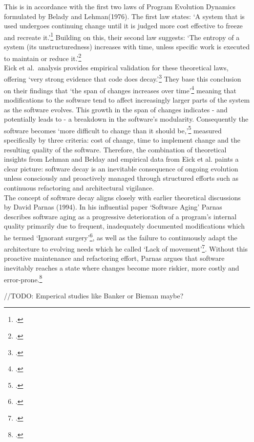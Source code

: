 This is in accordance with the first two laws of Program Evolution Dynamics formulated by Belady and Lehman(1976).
The first law states: `A system that is used undergoes continuing change until it is judged more cost effective to freeze and recreate it.'\footcite[228]{beladyModelLargeProgram1976}
Building on this, their second law suggests: `The entropy of a system (its unstructuredness) increases with time, unless specific work is executed to maintain or reduce it.'\footcite[228]{beladyModelLargeProgram1976}\\

Eick et al.\ analysis provides empirical validation for these theoretical laws, offering `very strong evidence that code does decay.'\footcite[7]{eickDoesCodeDecay2001}
They base this conclusion on their findings that `the span of changes increases over time'\footcite[7]{eickDoesCodeDecay2001} meaning that modifications to the software tend to affect increasingly larger parts of the system as the software evolves. This growth in the span of changes indicates - and potentially leads to -
a breakdown in the software's modularity. Consequently the software becomes `more difficult to change than it should be,'\footcite[3]{eickDoesCodeDecay2001} measured specifically by three criteria: cost of change, time to implement change and the resulting quality of the software.
Therefore, the combination of theoretical insights from Lehman and Belday and empirical data from Eick et al. paints a clear picture: software decay is an inevitable consequence of ongoing evolution unless consciously and proactively managed through structured efforts such as continuous refactoring and architectural vigilance.\\

The concept of software decay aligns closely with earlier theoretical discussions by David Parnas (1994). In his influential paper `Software Aging' Parnas describes software aging as a progressive deterioration of a program's internal quality primarily due to frequent, 
inadequately documented modifications which he termed `Ignorant surgery'\footcite[280]{296790}, as well as the failure to continuously adapt the architecture to evolving needs which he called `Lack of movement'\footcite[280]{296790}.
Without this proactive maintenance and refactoring effort, Parnas argues that software inevitably reaches a state where changes become more riskier, more costly and error-prone.\footcite[280-281]{296790}

//TODO: Emperical studies like Banker or Bieman maybe?

